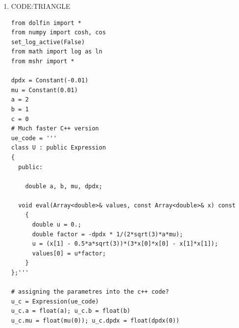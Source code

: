 \documentclass{article}
\begin{document}
\begin{enumerate}
\begin{verbatim}
      values[0] = factor * (pow(a,4) - pow(b,4) - \
      (4 * c*c * M*M)/(beta - alpha) - 8 * c*c * M*M * Q);      
    }
};'''

u_c = Expression(ue_code)
u_c.a = float(a); u_c.b = float(b)
u_c.mu = float(mu(0)); u_c.dpdx = float(dpdx(0))
u_c.c = float(c); u_c.F = float(F); u_c.M = float(M)
u_c.alpha = float(alpha); u_c.beta = float(beta)

def main(N, degree=1):
    mesh = generate_mesh(Circle(Point(0.0,0.0), a, N) - Circle(Point(a-c), b, N), N)
    V = FunctionSpace(mesh, 'CG', degree)
    u = TrialFunction(V)
    v = TestFunction(V)
    F = inner(grad(u), grad(v))*dx + 1/mu*dpdx*v*dx
    bc = DirichletBC(V, Constant(0), DomainBoundary())
    u_ = Function(V)
    solve(lhs(F) == rhs(F), u_, bcs=bc)

    # u_e = interpolate(u_exact(), V)
    u_e = interpolate(u_c, V)
    bc.apply(u_e.vector())
    u_error = errornorm(u_e, u_, degree_rise=0)

    if N==5 or N==20 or N==80:
      plot(u_,title="Numerical")
      plot(u_e,title="Exact")
      interactive()
    return u_error, mesh.hmin()

E = []; h = []; degree = 2
for n in [5, 10, 20, 40, 80]:
    ei, hi = main(n, degree=degree)
    E.append(ei)
    h.append(hi)

from math import log as ln
for i in range(1, len(E)):
    r = ln(E[i]/E[i-1])/ln(h[i]/h[i-1])
    print "h=%2.2E E=%2.2E r=%.2f" %(h[i], E[i], r)
\end{verbatim}

\item{CODE:TRIANGLE}
\begin{verbatim}
from dolfin import *
from numpy import cosh, cos
set_log_active(False)
from math import log as ln
from mshr import *

dpdx = Constant(-0.01)
mu = Constant(0.01)
a = 2
b = 1
c = 0
# Much faster C++ version
ue_code = '''
class U : public Expression
{
  public:

    double a, b, mu, dpdx;

  void eval(Array<double>& values, const Array<double>& x) const
    {
      double u = 0.;
      double factor = -dpdx * 1/(2*sqrt(3)*a*mu);
      u = (x[1] - 0.5*a*sqrt(3))*(3*x[0]*x[0] - x[1]*x[1]);
      values[0] = u*factor;      
    }
};'''

# assigning the parametres into the c++ code?
u_c = Expression(ue_code)
u_c.a = float(a); u_c.b = float(b)
u_c.mu = float(mu(0)); u_c.dpdx = float(dpdx(0))


\end{verbatim}
\end{enumerate}
\end{document}
